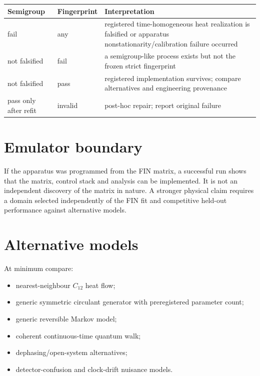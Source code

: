 \documentclass[11pt,a4paper,openany]{report}
\begin{document}
\begin{center}
\begingroup\small
\setlength{\tabcolsep}{3.5pt}
\renewcommand{\arraystretch}{1.16}
\begin{longtable}{@{}p{}p{}p{}@{}}
\toprule
\textbf{Semigroup} & \textbf{Fingerprint} & \textbf{Interpretation} \\
\midrule
\endhead
fail & any & registered time-homogeneous heat realization is falsified or apparatus nonstationarity/\allowbreak{}calibration failure occurred \\
not falsified & fail & a semigroup-like process exists but not the frozen strict fingerprint \\
not falsified & pass & registered implementation survives; compare alternatives and engineering provenance \\
pass only after refit & invalid & post-hoc repair; report original failure \\
\bottomrule
\end{longtable}
\endgroup
\end{center}

\section{Emulator boundary}

If the apparatus was programmed from the FIN matrix, a successful run shows that the matrix, control stack and analysis can be implemented. It is not an independent discovery of the matrix in nature. A stronger physical claim requires a domain selected independently of the FIN fit and competitive held-out performance against alternative models.

\section{Alternative models}

At minimum compare:

\begin{itemize}
\item 
nearest-neighbour \(C_{12}\) heat flow;

\item 
generic symmetric circulant generator with preregistered parameter count;

\item 
generic reversible Markov model;

\item 
coherent continuous-time quantum walk;

\item 
dephasing/\allowbreak{}open-system alternatives;

\item 
detector-confusion and clock-drift nuisance models.

\end{itemize}
\end{document}
